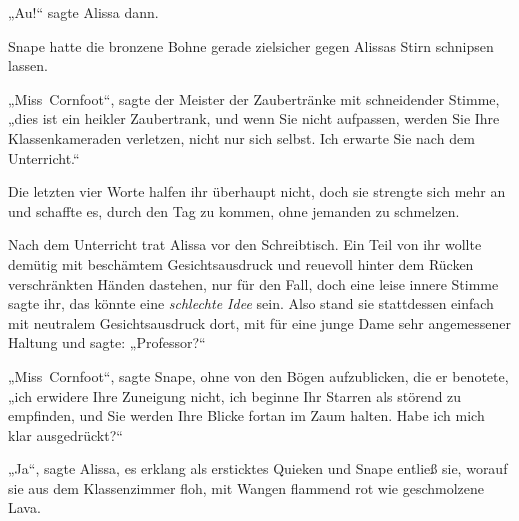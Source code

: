 „Au!“ sagte Alissa dann.

Snape hatte die bronzene Bohne gerade zielsicher gegen Alissas Stirn schnipsen lassen.

„Miss~Cornfoot“, sagte der Meister der Zaubertränke mit schneidender Stimme, „dies ist ein heikler Zaubertrank, und wenn Sie nicht aufpassen, werden Sie Ihre Klassenkameraden verletzen, nicht nur sich selbst. Ich erwarte Sie nach dem Unterricht.“

Die letzten vier Worte halfen ihr überhaupt nicht, doch sie strengte sich mehr an und schaffte es, durch den Tag zu kommen, ohne jemanden zu schmelzen.

Nach dem Unterricht trat Alissa vor den Schreibtisch. Ein Teil von ihr wollte demütig mit beschämtem Gesichtsausdruck und reuevoll hinter dem Rücken verschränkten Händen dastehen, nur für den Fall, doch eine leise innere Stimme sagte ihr, das könnte eine \emph{schlechte Idee} sein. Also stand sie stattdessen einfach mit neutralem Gesichtsausdruck dort, mit für eine junge Dame sehr angemessener Haltung und sagte:
„Professor?“

„Miss~Cornfoot“, sagte Snape, ohne von den Bögen aufzublicken, die er benotete, „ich erwidere Ihre Zuneigung nicht, ich beginne Ihr Starren als störend zu empfinden, und Sie werden Ihre Blicke fortan im Zaum halten. Habe ich mich klar ausgedrückt?“

„Ja“, sagte Alissa, es erklang als ersticktes Quieken und Snape entließ sie, worauf sie aus dem Klassenzimmer floh, mit Wangen flammend rot wie geschmolzene Lava.%

